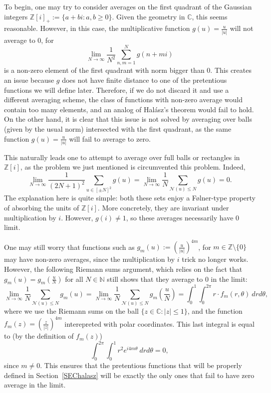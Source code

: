 \documentclass[11pt]{amsart}
\theoremstyle{definition}
\newcommand{\C}{{\mathbb C}}
\newcommand{\N}{{\mathbb N}}
\newcommand{\NN}{{\mathcal N}}
\newcommand{\Z}{{\mathbb Z}}
\newcommand{\WS}[1]{{\color{blue}{{#1}}}}
\newcommand{\AK}[1]{{\color{ForestGreen}{{#1}}}}
\begin{document}
\iffalse

To begin, one may try to consider averages on the first quadrant of the Gaussian integers $\Z[i]_+:=\{ a+bi : a, b \geq 0\}$. Given the geometry in $\C$, this seems reasonable. However, in this case, the multiplicative function $g(u)=\frac{u}{|u|}$ will not average to $0$, for
\[
\lim_{N \to \infty}  \frac{1}{N^2}\sum_{n,m=1}^N g(n+mi)
\]
is a non-zero element of the first quadrant with norm bigger than $0$. This creates an issue because $g$ does not have finite distance to one of the pretentious functions we will define later. Therefore, if we do not discard it and use a different averaging scheme, the class of functions with non-zero average would contain too many elements, and an analog of Hal\'asz's theorem would fail to hold. On the other hand, it is clear that this issue is not solved by averaging over balls (given by the usual norm) intersected with the first quadrant, as the same function $g(u)=\frac{u}{|u|}$ will fail to average to zero.

This naturally leads one to attempt to  average over full balls or rectangles in $\Z[i]$, as the problem we just mentioned is circumvented this problem. Indeed,
\[
\lim_{N \to \infty} \frac{1}{(2N+1)^2}\sum_{u \in [\pm N]^2} g(u) = \lim_{N \to \infty} \frac{1}{N}\sum_{\NN(u) \leq N} g(u) = 0.
\]
The explanation here is quite simple: both these sets enjoy a F\o lner-type property of absorbing the units of $\Z[i]$. More concretely, they are invariant under multiplication by $i$. However, $g(i) \neq 1$, so these averages necessarily have $0$ limit.

One may still worry that functions such as $g_m(u):=\left(\frac{u}{|u|}\right)^{4m}$, for $m \in \Z \setminus \{0\}$ may have non-zero averages, since the multiplication by $i$ trick no longer works. However, the following Riemann sums argument, which relies on the fact that $g_m(u)=g_m\left(\frac{u}{N}\right)$ for all $N \in \N$ still shows that they average to $0$ in the limit:
\[
\lim_{N \to \infty} \frac{1}{N} \sum_{\NN(u) \leq N} g_m(u) = \lim_{N \to \infty} \frac{1}{N} \sum_{\NN(u) \leq N} g_m\left(\frac{u}{N}\right) = \int_0^1\int_0^{2\pi} r \cdot f_m(r,\theta) \ drd\theta,\]
where we use the Riemann sums on the ball $\{ z \in\C : |z| \leq 1\}$, and the function $f_m(z)=\left(\frac{z}{|z|}\right)^{4m}$ interepreted with polar coordinates. This last integral is equal to (by the definition of $f_m(z)$)
\[ \int_0^{2\pi} \int_0^1 r^2 e^{i4m\theta} \ drd\theta = 0,
\]
since $m \neq 0$. This ensures that the pretentious functions that will be properly defined in Section~\ref{SEChalasz} will be exactly the only ones that fail to have zero average in the limit.
\end{document}
